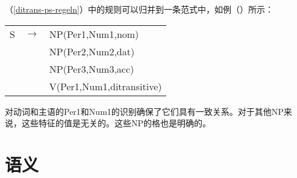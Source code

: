 \noindent
（\ref{ditrans-ps-regeln}）中的规则可以归并到一条范式中，如例（）所示：
\ea
\label{ditrans-schema}
\begin{tabular}[t]{@{}l@{ }l@{ }l}
S  & $\to$ & NP({Per1},{Num1},{nom}) \\
   &       & NP(Per2,Num2,{dat})\\
   &       & NP(Per3,Num3,{acc})\\
   &       & V({Per1},{Num1},ditransitive)\\
\end{tabular}
\z
对动词和主语的Per1和Num1的识别确保了它们具有一致关系。对于其他NP来说，这些特征的值是无关的。这些NP的格也是明确的。

\section{语义}
\label{sec-PSG-Semantik}

